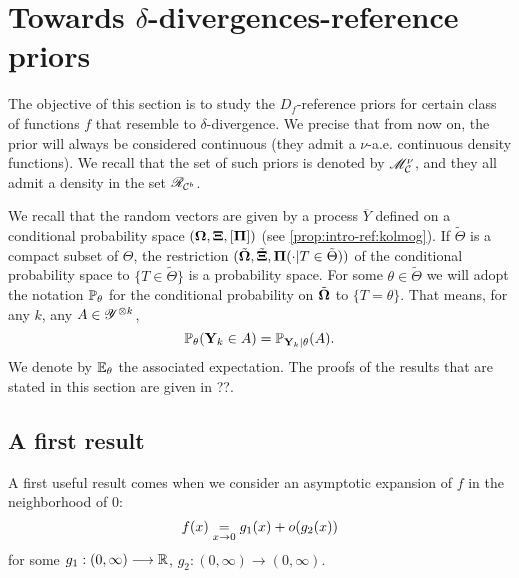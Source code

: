 \section{Towards $\delta$-divergences-reference priors}
\label{sec:PSGSA:towardsdelta}

The objective of this section is to study the $D_f$-reference priors for certain class of functions $f$ that resemble to $\delta$-divergence.
We precise that from now on, the prior will always be considered continuous (they admit a $\nu$-a.e. continuous density functions). We recall that the set of such priors is denoted by $\mathscr{M}^\nu_{\mathcal{C}} $, and they all admit a density in the set $\mathscr{R}_{\mathcal{C}^b}$. %

We recall that the random vectors are given by a process $\overline{Y}$ defined on a conditional probability space $(\mathbf{\Omega},\mathbf{\Xi},[\mathbf{\Pi}] )$ (see \cref{prop:intro-ref:kolmog}). If $\tilde\Theta$ is a compact subset of $\Theta$, the restriction $(\tilde{\mathbf{\Omega}},\tilde{\mathbf{\Xi}}, \mathbf{\Pi}(\cdot|T\in\tilde\Theta))$ of the conditional probability space to $\{T\in\tilde\Theta\}$ is a probability space.
For some $\theta\in\tilde\Theta$ we will adopt the notation $\mathbb{P}_\theta$ for the conditional probability on $\tilde{\mathbf{\Omega}}$ to $\{T=\theta\}$. That means, for any $k$, any $A\in\mathscr{Y}^{\otimes k}$, 
    \begin{equation}
        \mathbb{P}_\theta(\mathbf{Y}_k\in A) = \mathbb{P}_{\mathbf{Y}_k|\theta}(A).
    \end{equation}
We denote by $\mathbb{E}_\theta$ the associated expectation.
The proofs of the results that are stated in this section are given in ??.


\subsection{A first result}

A first useful result comes when we consider an asymptotic expansion of $f$ in the neighborhood of $0$:
\begin{equation}
    f(x) \overset{}{\underset{x\rightarrow0}{=}} g_1(x) + o(g_2(x))
\end{equation}
for some $g_1:(0,\infty)\longrightarrow\mathbb{R}$, $g_2:(0,\infty)\to(0,\infty)$.


